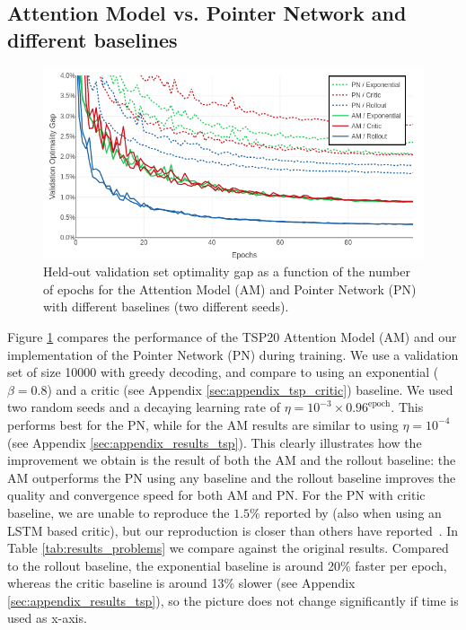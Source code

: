 \subsection{Attention Model vs. Pointer Network and different baselines}


\begin{figure}
\vspace{-0.25in}
\begin{center}
\centerline{\includegraphics[width=\linewidth]{./images/baselines}}
\caption{Held-out validation set optimality gap as a function of the number of epochs for the Attention Model (AM) and Pointer Network (PN) with different baselines (two different seeds).}
\label{fig:progress}
\end{center}
\vskip -0.25in
\end{figure}
Figure \ref{fig:progress} compares the performance of the TSP20 Attention Model (AM) and our implementation of the Pointer Network (PN) during training. We use a validation set of size 10000 with greedy decoding, and compare to using an exponential ($\beta = 0.8$) and a critic (see Appendix \ref{sec:appendix_tsp_critic}) baseline. We used two random seeds and a decaying learning rate of $\eta = 10^{-3} \times 0.96^{\text{epoch}}$. This performs best for the PN, while for the AM results are similar to using $\eta = 10^{-4}$ (see Appendix \ref{sec:appendix_results_tsp}). This clearly illustrates how the improvement we obtain is the result of both the AM and the rollout baseline: the AM outperforms the PN using any baseline and the rollout baseline improves the quality and convergence speed for both AM and PN. For the PN with critic baseline, we are unable to reproduce the $1.5\%$ reported by \citet{bello2016neural} (also when using an LSTM based critic), but our reproduction is closer than others have reported~\citep{dai2017learning,nazari2018reinforcement}. In Table \ref{tab:results_problems} we compare against the original results. Compared to the rollout baseline, the exponential baseline is around 20\% faster per epoch, whereas the critic baseline is around 13\% slower (see Appendix \ref{sec:appendix_results_tsp}), so the picture does not change significantly if time is used as x-axis.